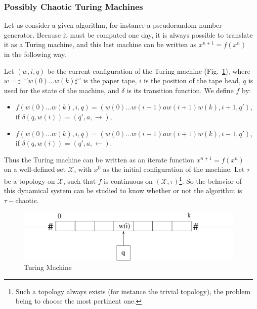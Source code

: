 \subsubsection{Possibly Chaotic Turing Machines}

Let us consider a given algorithm, for instance a pseudorandom number generator. Because it must be 
computed one day, it is always possible to translate it as a Turing 
machine, and this last machine can be written as $x^{n+1} = f(x^n)$ in 
the following way. 

Let $(w,i,q)$ be the current configuration of the 
Turing machine (Fig.~\ref{Turing}), where $w=\sharp^{-\omega} w(0) 
\hdots w(k)\sharp^{\omega}$ is the paper tape, $i$ is the position of 
the tape head, $q$ is used for the state of the machine, and $\delta$ is 
its transition function. %
We define $f$ by:
\begin{itemize}
\item $f(w(0) \hdots w(k),i,q) = ( w(0) \hdots w(i-1)aw(i+1)w(k),i+1,q')$, if  $\delta(q,w(i)) = (q',a,\rightarrow)$,
\item $f( w(0) \hdots w(k),i,q) = (w(0) \hdots w(i-1)aw(i+1)w(k),i-1,q')$,  if $\delta(q,w(i)) = (q',a,\leftarrow)$.
\end{itemize}
Thus the Turing machine can be written as an iterate function 
$x^{n+1}=f(x^n)$ on a well-defined set $\mathcal{X}$, with $x^0$ as the 
initial configuration of the machine. %
Let $\tau$ be a topology on $\mathcal{X}$, such that $f$ is continuous on
$(\mathcal{X},\tau)$\footnote{Such a topology always exists (for instance the trivial
topology), the problem being to choose the most pertinent one.}. So the behavior of this 
dynamical system can be studied to know whether or not the algorithm
is $\tau-$chaotic. 
  
\begin{figure}[h!]
  \centering
\includegraphics[scale=0.5]{Turing.eps}
\caption{Turing Machine}
\label{Turing}
\end{figure}












